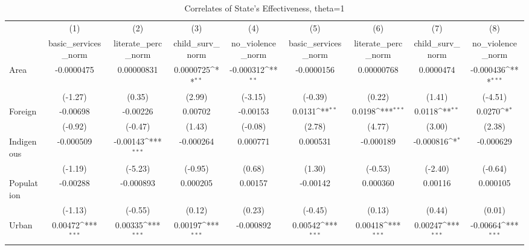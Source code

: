 \begin{table}[htbp]\centering
\def\sym#1{\ifmmode^{#1}\else\(^{#1}\)\fi}
\caption{Correlates of State's Effectiveness, theta=1}
\begin{tabular}{l*{8}{c}}
\hline\hline
          &\multicolumn{1}{c}{(1)}&\multicolumn{1}{c}{(2)}&\multicolumn{1}{c}{(3)}&\multicolumn{1}{c}{(4)}&\multicolumn{1}{c}{(5)}&\multicolumn{1}{c}{(6)}&\multicolumn{1}{c}{(7)}&\multicolumn{1}{c}{(8)}\\
          &\multicolumn{1}{c}{basic\_services\_norm}&\multicolumn{1}{c}{literate\_perc\_norm}&\multicolumn{1}{c}{child\_surv\_norm}&\multicolumn{1}{c}{no\_violence\_norm}&\multicolumn{1}{c}{basic\_services\_norm}&\multicolumn{1}{c}{literate\_perc\_norm}&\multicolumn{1}{c}{child\_surv\_norm}&\multicolumn{1}{c}{no\_violence\_norm}\\
\hline
Area      &-0.0000475         &0.00000831         &0.0000725\sym{**} &-0.000312\sym{**} &-0.0000156         &0.00000768         &0.0000474         &-0.000436\sym{***}\\
          &  (-1.27)         &   (0.35)         &   (2.99)         &  (-3.15)         &  (-0.39)         &   (0.22)         &   (1.41)         &  (-4.51)         \\
[1em]
Foreign   & -0.00698         & -0.00226         &  0.00702         & -0.00153         &   0.0131\sym{**} &   0.0198\sym{***}&   0.0118\sym{**} &   0.0270\sym{*}  \\
          &  (-0.92)         &  (-0.47)         &   (1.43)         &  (-0.08)         &   (2.78)         &   (4.77)         &   (3.00)         &   (2.38)         \\
[1em]
Indigenous&-0.000509         & -0.00143\sym{***}&-0.000264         & 0.000771         & 0.000531         &-0.000189         &-0.000816\sym{*}  &-0.000629         \\
          &  (-1.19)         &  (-5.23)         &  (-0.95)         &   (0.68)         &   (1.30)         &  (-0.53)         &  (-2.40)         &  (-0.64)         \\
[1em]
Population& -0.00288         &-0.000893         & 0.000205         &  0.00157         & -0.00142         & 0.000360         &  0.00116         & 0.000105         \\
          &  (-1.13)         &  (-0.55)         &   (0.12)         &   (0.23)         &  (-0.45)         &   (0.13)         &   (0.44)         &   (0.01)         \\
[1em]
Urban     &  0.00472\sym{***}&  0.00335\sym{***}&  0.00197\sym{***}&-0.000892         &  0.00542\sym{***}&  0.00418\sym{***}&  0.00247\sym{***}& -0.00664\sym{***}\\

\end{tabular}
\end{table}
